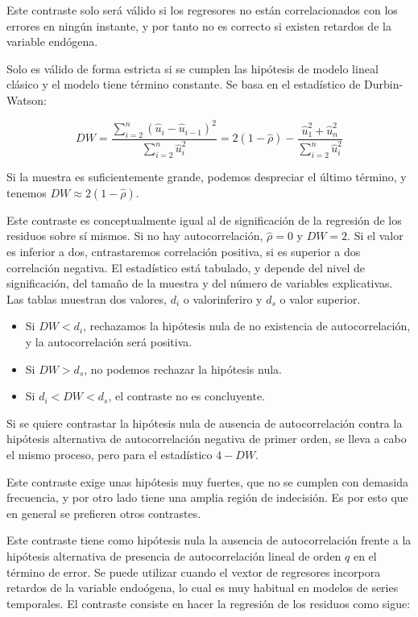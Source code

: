 Este contraste solo ser\'a v\'alido si los regresores no est\'an correlacionados con los errores en ning\'un instante, y por tanto no es correcto si existen retardos de la variable end\'ogena.

Solo es v\'alido de forma estricta si se cumplen las hip\'otesis de modelo lineal cl\'asico y el modelo tiene t\'ermino constante. Se basa en el estad\'istico de Durbin-Watson:

\[
DW=\dfrac{\sum_{i=2}^{n}\left(\hat{u}_{i}-\hat{u}_{i-1}\right)^{2}}{\sum_{i=2}^{n}\hat{u}_{i}^{2}}=2(1-\hat{\rho})-\dfrac{\hat{u}_1^2+\hat{u}_n^2}{\sum_{i=2}^{n}\hat{u}_{i}^{2}}
\]

Si la muestra es suficientemente grande, podemos despreciar el \'ultimo t\'ermino, y tenemos $DW\approx 2(1-\hat{\rho})$.

Este contraste es conceptualmente igual al de significaci\'on de la regresi\'on de los residuos sobre s\'i mismos. Si no hay autocorrelaci\'on, $\hat{\rho}=0$ y $DW=2$. Si el valor es inferior a dos, cntrastaremos correlaci\'on positiva, si es superior a dos correlaci\'on negativa. El estad\'istico est\'a tabulado, y depende del nivel de significaci\'on, del tama\~no de la muestra y del n\'umero de variables explicativas. Las tablas muestran dos valores, $d_i$ o valorinferiro y $d_s$ o valor superior.
\begin{itemize}
\item Si $DW<d_i$, rechazamos la hip\'otesis nula de no existencia de autocorrelaci\'on, y la autocorrelaci\'on ser\'a positiva.
\item Si $DW>d_s$, no podemos rechazar la hip\'otesis nula.
\item Si $d_i<DW<d_s$, el contraste no es concluyente.
\end{itemize}

Si se quiere contrastar la hip\'otesis nula de ausencia de autocorrelaci\'on contra la hip\'otesis alternativa de autocorrelaci\'on negativa de primer orden, se lleva a cabo el mismo proceso, pero para el estad\'istico $4-DW$.

Este contraste exige unas hip\'otesis muy fuertes, que no se cumplen con demasida frecuencia, y por otro lado tiene una amplia regi\'on de indecisi\'on. Es por esto que en general se prefieren otros contrastes.


Este contraste tiene como hip\'otesis nula la ausencia de autocorrelaci\'on frente a la hip\'otesis alternativa de presencia de autocorrelaci\'on lineal de orden $q$ en el t\'ermino de error. Se puede utilizar cuando el vextor de regresores incorpora retardos de la variable endo\'ogena, lo cual es muy habitual en modelos de series temporales. El contraste consiste en hacer la regresi\'on de los residuos como sigue:

